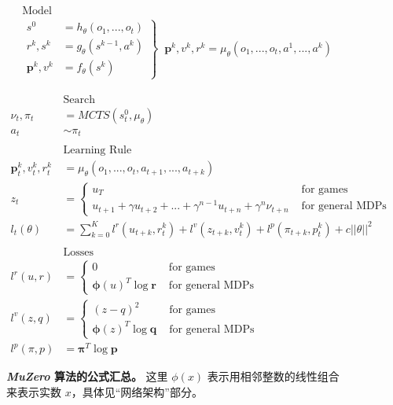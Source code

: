 \documentclass{article}
\newcommand{\muzero}{\emph{MuZero}}
\begin{document}
\begin{figure} %

\begin{align*}
&\text{Model} \\
&\left.
\begin{array}{ll}
s^0 &= h_\theta(o_1, ..., o_t) \\
r^k, s^k &= g_\theta(s^{k-1}, a^k) \\
%
\mathbf{p}^k, v^k &= f_\theta(s^k)
\end{array}
\right\} \;\;
\mathbf{p}^k, v^k, r^k = \mu_\theta(o_1, ..., o_t, a^1, ..., a^k)
\end{align*}

\begin{align*}
&\text{Search}\\
\nu_t, \pi_t &= MCTS(s^0_t, \mu_\theta) \\
a_t &\sim \pi_t \\
\\
&\text{Learning Rule} \\
\mathbf{p}^k_t, v^k_t, r^k_t &= \mu_\theta(o_1, ..., o_t, a_{t+1}, ..., a_{t+k}) \\
z_t &= \left\{
\begin{array}{lr}
u_T
& \text{ for games } \\
u_{t+1} + \gamma u_{t+2} + ... + \gamma^{n-1} u_{t+n} + \gamma^n \nu_{t+n}
& \text{ for general MDPs }
\end{array}
\right. \\
l_t(\theta) &= \sum_{k=0}^K l^r (u_{t+k}, r_t^k) + l^v(z_{t+k}, v^k_t) + l^p(\pi_{t+k}, p^k_t) + c ||\theta||^2 \\
\\
&\text{Losses} \\
l^r(u, r) &= \left\{
\begin{array}{lr}
0 & \text{ for games } \\
\boldsymbol{\phi}(u)^T \log \mathbf{r} & \text{ for general MDPs }
\end{array}
\right. \\
l^v(z, q) &= \left\{
\begin{array}{lr}
(z - q)^2 & \text{ for games } \\
\boldsymbol{\phi}(z)^T \log \mathbf{q} & \text{ for general MDPs }
\end{array}
\right. \\
l^p(\pi, p) &= \boldsymbol{\pi}^T \log \mathbf{p}
\end{align*}

\caption{\label{fig:muzero_equations}
\textbf{\muzero{} 算法的公式汇总。} 这里 $\phi(x)$ 表示用相邻整数的线性组合来表示实数 $x$，具体见“网络架构”部分。}
\end{figure} %
\end{document}
